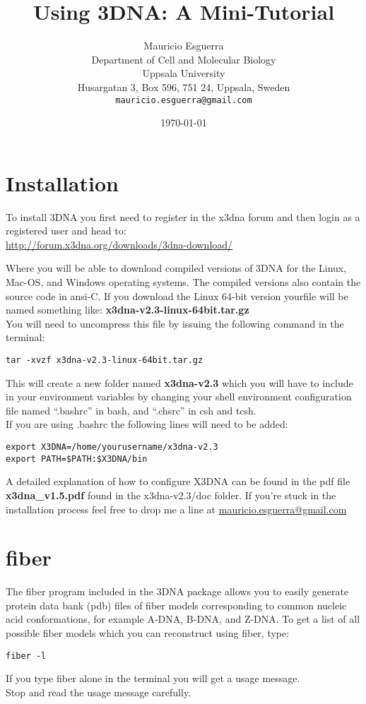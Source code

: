 \documentclass[10pt, oneside, pdftex]{article}
\title{Using 3DNA: A Mini-Tutorial}
\author{Mauricio Esguerra\\
\small  Department of Cell and Molecular Biology\\[-0.8ex]
\small  Uppsala University\\[-0.8ex]
\small  Husargatan 3, Box 596, 751 24, Uppsala, Sweden\\[-0.8ex]
\small  \texttt{mauricio.esguerra@gmail.com}}
\date{\today}
\begin{document}
\maketitle
\tableofcontents



\section{Installation}
To install 3DNA you first need to register in the x3dna forum and then
login as a registered user and head to:\\
\url{http://forum.x3dna.org/downloads/3dna-download/}

\noindent Where you will be able to download compiled versions of 3DNA
for the Linux, Mac-OS, and Windows operating systems. The compiled
versions also contain the source code in ansi-C.
If  you download  the  Linux  64-bit version  yourfile  will be  named
something like:
\textbf{x3dna-v2.3-linux-64bit.tar.gz}\\

You will need to uncompress this file by issuing the following command
in the terminal:
\begin{Verbatim}
tar -xvzf x3dna-v2.3-linux-64bit.tar.gz
\end{Verbatim}
This will create a new folder named \textbf{x3dna-v2.3} which you will
have to include  in your environment variables by  changing your shell
environment  configuration   file  named  ``.bashrc''  in   bash,  and
``.chsrc'' in csh  and tcsh.\\ If you are using  .bashrc the following
lines will need to be added:
\begin{Verbatim}
export X3DNA=/home/yourusername/x3dna-v2.3
export PATH=$PATH:$X3DNA/bin
\end{Verbatim}
A detailed explanation  of how to configure X3DNA can  be found in the
pdf   file  \textbf{x3dna\_v1.5.pdf}   found  in   the  x3dna-v2.3/doc
folder. If you're stuck in the  installation process feel free to drop
me a line at \url{mauricio.esguerra@gmail.com}

\section{fiber}
The \textrm{fiber} program included in  the 3DNA package allows you to
easily  generate  protein  data  bank  (pdb)  files  of  fiber  models
corresponding to common nucleic acid conformations, for example A-DNA,
B-DNA, and  Z-DNA.  To get a  list of all possible  fiber models which
you can reconstruct using \textrm{fiber}, type:
\begin{Verbatim}
fiber -l
\end{Verbatim}
If you type \textrm{fiber} alone in the terminal you will get a usage
message.\\
Stop and read the usage message carefully.\\
\end{document}
